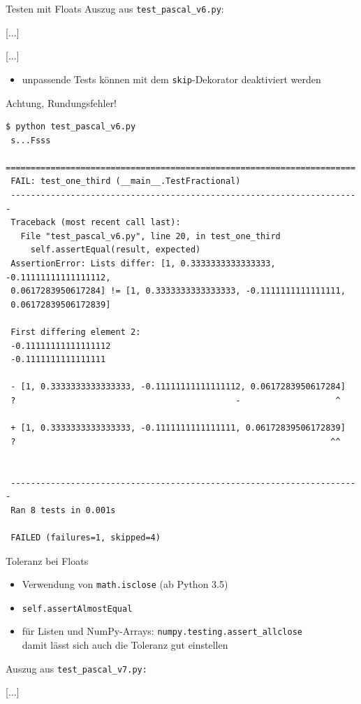 \documentclass[t, utf8x, 10pt]{beamer}
\begin{document}
\begin{frame}{Testen mit Floats}
 Auszug aus \texttt{test\_pascal\_v6.py}:
 \begin{small}
  
  [...]
  
  [...]
  
 \end{small}
 \begin{itemize}
  \item unpassende Tests können mit dem \texttt{skip}-Dekorator deaktiviert werden
 \end{itemize}
\end{frame}


\begin{frame}[fragile]{Achtung, Rundungsfehler!}
 \begin{scriptsize}
  \begin{lstlisting}[language={}]
 $ python test_pascal_v6.py
 s...Fsss
 ======================================================================
 FAIL: test_one_third (__main__.TestFractional)
 ----------------------------------------------------------------------
 Traceback (most recent call last):
   File "test_pascal_v6.py", line 20, in test_one_third
     self.assertEqual(result, expected)
 AssertionError: Lists differ: [1, 0.3333333333333333, -0.11111111111111112,
 0.0617283950617284] != [1, 0.3333333333333333, -0.1111111111111111,
 0.06172839506172839]

 First differing element 2:
 -0.11111111111111112
 -0.1111111111111111

 - [1, 0.3333333333333333, -0.11111111111111112, 0.0617283950617284]
 ?                                            -                   ^

 + [1, 0.3333333333333333, -0.1111111111111111, 0.06172839506172839]
 ?                                                               ^^


 ----------------------------------------------------------------------
 Ran 8 tests in 0.001s

 FAILED (failures=1, skipped=4)
  \end{lstlisting}
 \end{scriptsize}
\end{frame}


\begin{frame}{Toleranz bei Floats}
 \begin{itemize}
  \item Verwendung von \texttt{math.isclose} (ab Python 3.5)
  \item \texttt{self.assertAlmostEqual}
  \item für Listen und NumPy-Arrays: \texttt{numpy.testing.assert\_allclose}\\
	damit lässt sich auch die Toleranz gut einstellen
 \end{itemize}

 Auszug aus \texttt{test\_pascal\_v7.py:}
 
 [...]
 

\end{frame}
\end{document}
